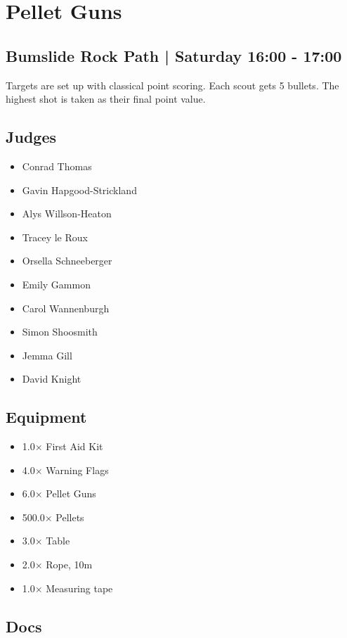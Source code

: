 \documentclass[10pt]{article}
\begin{document}
		\begin{minipage}{\linewidth}
		\setcounter{section}{13}
	\section{Pellet Guns }
	\subsection*{Bumslide Rock Path | Saturday 16:00 - 17:00}

	Targets are set up with classical point scoring. Each scout gets 5 bullets. The highest shot is taken as their final point value.

	\begin{multicols}{2}
	\subsection*{\faUsers \: Judges}
	\begin{itemize}
			\item Conrad Thomas
			\item Gavin Hapgood-Strickland
			\item Alys Willson-Heaton
			\item Tracey le Roux
			\item Orsella Schneeberger
			\item Emily Gammon
			\item Carol Wannenburgh
			\item Simon Shoosmith
			\item Jemma Gill
			\item David Knight
		\end{itemize}
	\columnbreak
	\subsection*{\faWrench \: Equipment}
	
        \begin{itemize}
                    \item 1.0$\times$ \: First Aid Kit
                    \item 4.0$\times$ \: Warning Flags
                    \item 6.0$\times$ \: Pellet Guns
                    \item 500.0$\times$ \: Pellets
                    \item 3.0$\times$ \: Table
                    \item 2.0$\times$ \: Rope, 10m
                    \item 1.0$\times$ \: Measuring tape 
                \end{itemize}
                \vfill\null
        \subsection*{\faFile \: Docs}
     	\end{multicols}


	\vspace{1cm}
	\end{minipage}
\end{document}
